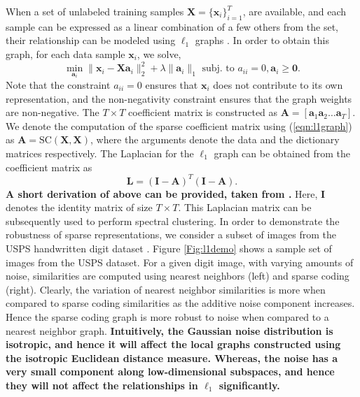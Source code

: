When a set of unlabeled training samples $\mathbf{X} = \{\mathbf{x}_i\}_{i=1}^T$, are available, and each sample can be expressed as a linear combination of a few others from the set, their relationship can be modeled using $\ell_1$ graphs \cite{cheng2010}. In order to obtain this graph, for each data sample $\mathbf{x}_i$, we solve,
\begin{equation}
\min_{\mathbf{a}_i} \|\mathbf{x}_i - \mathbf{X} \mathbf{a}_i\|_2^2 + \lambda \|\mathbf{a}_i\|_1 \text{ subj. to } a_{ii} = 0, \mathbf{a}_i \geq \mathbf{0}.
\label{eqn:l1graph}
\end{equation}Note that the constraint $a_{ii} = 0$ ensures that $\mathbf{x}_i$ does not contribute to its own representation, and the  non-negativity constraint ensures that the graph weights are non-negative. The $T \times T$ coefficient matrix is constructed as $\mathbf{A} = [\mathbf{a}_1 \mathbf{a}_2 \ldots \mathbf{a}_T]$. We denote the computation of the sparse coefficient matrix using (\ref{eqn:l1graph}) as $\mathbf{A} = \text{SC}(\mathbf{X},\mathbf{X})$, where the arguments denote the data and the dictionary matrices respectively. The Laplacian for the $\ell_1$ graph can be obtained from the coefficient matrix as \cite{wang2009multi}
\begin{equation}
\mathbf{L} = (\mathbf{I} - \mathbf{A})^T(\mathbf{I} - \mathbf{A}).
\label{eqn:lap_l1_graph}
\end{equation} \textbf{A short derivation of above can be provided, taken from \cite{wang2009multi}.} Here, $\mathbf{I}$ denotes the identity matrix of size $T \times T$. This Laplacian matrix can be subsequently used to perform spectral clustering. In order to demonstrate the robustness of sparse representations, we consider a subset of images from the USPS handwritten digit dataset \cite{USPSdata}. Figure \ref{Fig:l1demo} shows a sample set of images from the USPS dataset. For a given digit image, with varying amounts of noise, similarities are computed using nearest neighbors (left) and sparse coding (right). Clearly, the variation of nearest neighbor similarities is more when compared to sparse coding similarities as the additive noise component increases. Hence the sparse coding graph is more robust to noise when compared to a nearest neighbor graph. \textbf{Intuitively, the Gaussian noise distribution is isotropic, and hence it will affect the local graphs constructed using the isotropic Euclidean distance measure. Whereas, the noise has a very small component along low-dimensional subspaces, and hence they will not affect the relationships in $\ell_1$ significantly.}

